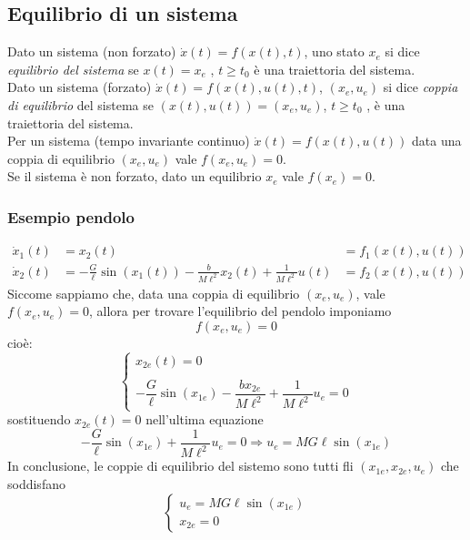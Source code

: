 \documentclass{article}
\numberwithin{equation}{subsection}
\let\oldsubsection\subsection%
\renewcommand{\subsection}{%
  \renewcommand{\theequation}{\thesubsection.\arabic{equation}}%
  \oldsubsection}%
\begin{document}
\subsection{Equilibrio di un sistema}
Dato un sistema (non forzato) $\dot x(t) = f (x(t), t)$, uno stato $x_e$ si dice \textit{equilibrio del sistema} se $x(t) = x_e$ , $t\geq t_0$ è una traiettoria del sistema.
\vspace*{0.2cm}\\
Dato un sistema (forzato) $\dot x(t) = f (x(t), u(t), t)$, $(x_e , u_e )$ si dice \textit{coppia di equilibrio} del sistema se $(x(t), u(t)) = (x_e , u_e )$, $t \geq t_0$ , è una traiettoria del sistema.
\vspace*{0.2cm}\\
Per un sistema (tempo invariante continuo) $\dot x(t) = f (x(t), u(t))$ data una coppia di equilibrio $(x_e,u_e)$ vale $f(x_e,u_e)=0$.\\
Se il sistema è non forzato, dato un equilibrio $x_e$ vale $f(x_e)=0$.


\subsubsection{Esempio pendolo}
\begin{align*}
    \dot x_1(t) &= x_2(t) &= f_1(x(t),u(t))\\
    \dot x_2(t) &= - \frac{G}{\ell} \sin (x_1(t)) - \frac{b}{M \ell ^2}x_2(t) + \frac{1}{M\ell^2}u(t) &=f_2(x(t),u(t))
\end{align*}
Siccome sappiamo che, data una coppia di equilibrio $(x_e,u_e)$, vale $f(x_e,u_e)=0$, allora per trovare l'equilibrio del pendolo imponiamo 
\begin{equation}
    f(x_e,u_e)=0
\end{equation}
cioè:
\begin{equation}
    \begin{cases}
        x_{2e}(t) = 0\\
        \\
        - \dfrac{G}{\ell} \sin (x_{1e}) - \dfrac{b x_{2e}}{M \ell ^2} + \dfrac{1}{M\ell^2}u_e =0
    \end{cases}
\end{equation}
sostituendo $x_{2e}(t)=0$ nell'ultima equazione
\begin{equation}
    - \dfrac{G}{\ell} \sin (x_{1e}) + \dfrac{1}{M\ell^2}u_e =0 \Longrightarrow u_e = M G \ell \sin(x_{1e})
\end{equation}
In conclusione, le coppie di equilibrio del sistemo sono tutti fli $(x_{1e}, x_{2e},u_e)$ che soddisfano
\begin{equation}
    \begin{cases}
        u_e = M G \ell \sin(x_{1e})\\
        x_{2e}=0
    \end{cases}
\end{equation}
\end{document}
